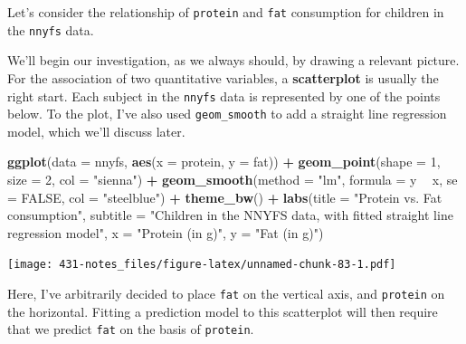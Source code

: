 \documentclass[
]{book}
\newenvironment{Shaded}{\begin{snugshade}}{\end{snugshade}}
\newcommand{\DataTypeTok}[1]{\textcolor[rgb]{0.13,0.29,0.53}{#1}}
\newcommand{\DecValTok}[1]{\textcolor[rgb]{0.00,0.00,0.81}{#1}}
\newcommand{\KeywordTok}[1]{\textcolor[rgb]{0.13,0.29,0.53}{\textbf{#1}}}
\newcommand{\NormalTok}[1]{#1}
\newcommand{\OperatorTok}[1]{\textcolor[rgb]{0.81,0.36,0.00}{\textbf{#1}}}
\newcommand{\OtherTok}[1]{\textcolor[rgb]{0.56,0.35,0.01}{#1}}
\newcommand{\StringTok}[1]{\textcolor[rgb]{0.31,0.60,0.02}{#1}}
\begin{document}
Let's consider the relationship of \texttt{protein} and \texttt{fat} consumption for children in the \texttt{nnyfs} data.

\begin{Shaded}
\end{Shaded}

We'll begin our investigation, as we always should, by drawing a relevant picture. For the association of two quantitative variables, a \textbf{scatterplot} is usually the right start. Each subject in the \texttt{nnyfs} data is represented by one of the points below. To the plot, I've also used \texttt{geom\_smooth} to add a straight line regression model, which we'll discuss later.

\begin{Shaded}
\begin{Highlighting}[]
\KeywordTok{ggplot}\NormalTok{(}\DataTypeTok{data =}\NormalTok{ nnyfs, }\KeywordTok{aes}\NormalTok{(}\DataTypeTok{x =}\NormalTok{ protein, }\DataTypeTok{y =}\NormalTok{ fat)) }\OperatorTok{+}
\StringTok{    }\KeywordTok{geom_point}\NormalTok{(}\DataTypeTok{shape =} \DecValTok{1}\NormalTok{, }\DataTypeTok{size =} \DecValTok{2}\NormalTok{, }\DataTypeTok{col =} \StringTok{"sienna"}\NormalTok{) }\OperatorTok{+}
\StringTok{    }\KeywordTok{geom_smooth}\NormalTok{(}\DataTypeTok{method =} \StringTok{"lm"}\NormalTok{, }\DataTypeTok{formula =}\NormalTok{ y }\OperatorTok{~}\StringTok{ }\NormalTok{x, }\DataTypeTok{se =} \OtherTok{FALSE}\NormalTok{, }\DataTypeTok{col =} \StringTok{"steelblue"}\NormalTok{) }\OperatorTok{+}
\StringTok{    }\KeywordTok{theme_bw}\NormalTok{() }\OperatorTok{+}
\StringTok{    }\KeywordTok{labs}\NormalTok{(}\DataTypeTok{title =} \StringTok{"Protein vs. Fat consumption"}\NormalTok{,}
         \DataTypeTok{subtitle =} \StringTok{"Children in the NNYFS data, with fitted straight line regression model"}\NormalTok{,}
         \DataTypeTok{x =} \StringTok{"Protein (in g)"}\NormalTok{, }\DataTypeTok{y =} \StringTok{"Fat (in g)"}\NormalTok{)}
\end{Highlighting}
\end{Shaded}

\texttt{[image: 431-notes\_files/figure-latex/unnamed-chunk-83-1.pdf]}

Here, I've arbitrarily decided to place \texttt{fat} on the vertical axis, and \texttt{protein} on the horizontal. Fitting a prediction model to this scatterplot will then require that we predict \texttt{fat} on the basis of \texttt{protein}.
\end{document}
